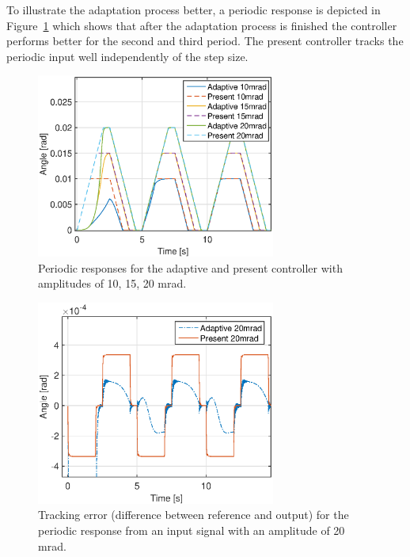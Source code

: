 \FloatBarrier
To illustrate the adaptation process better, a periodic response is depicted in Figure~\ref{fig:periodic_resp} which shows that after the adaptation process is finished the controller performs better for the second and third period. The present controller tracks the periodic input well independently of the step size.

\begin{figure}[h!]
  \centering
  \includegraphics[width=0.7\textwidth]{fig/matlab/periodicresponse.eps}
  \caption{\label{fig:periodic_resp} Periodic responses for the adaptive and present controller with amplitudes of 10, 15, 20 mrad.}
\end{figure}

\begin{figure}[h!]
  \centering
  \includegraphics[width=0.7\textwidth]{fig/matlab/trackingerror.eps}
  \caption{\label{fig:adapt_trackingerror} Tracking error (difference between reference and output) for the periodic response from an input signal with an amplitude of 20 mrad.}
\end{figure}

